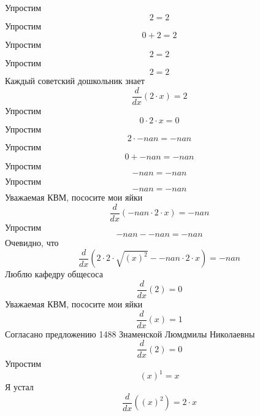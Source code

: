 \documentclass[12pt, a4paper]{article}
\begin{document}
Упростим
\begin{equation}
2 = 2
\end{equation}
Упростим
\begin{equation}
0+2 = 2
\end{equation}
Упростим
\begin{equation}
2 = 2
\end{equation}
Упростим
\begin{equation}
2 = 2
\end{equation}
Каждый советский дошкольник знает
\begin{equation}
\frac{d}{dx}(2 \cdot x) = 2
\end{equation}
Упростим
\begin{equation}
0 \cdot 2 \cdot x = 0
\end{equation}
Упростим
\begin{equation}
2 \cdot -nan = -nan
\end{equation}
Упростим
\begin{equation}
0+-nan = -nan
\end{equation}
Упростим
\begin{equation}
-nan = -nan
\end{equation}
Упростим
\begin{equation}
-nan = -nan
\end{equation}
Уважаемая КВМ, пососите мои яйки
\begin{equation}
\frac{d}{dx}(-nan \cdot 2 \cdot x) = -nan
\end{equation}
Упростим
\begin{equation}
-nan--nan = -nan
\end{equation}
Очевидно, что
\begin{equation}
\frac{d}{dx}(2 \cdot 2 \cdot \sqrt{{(x)}^{2}}--nan \cdot 2 \cdot x) = -nan
\end{equation}
Люблю кафедру общесоса
\begin{equation}
\frac{d}{dx}(2) = 0
\end{equation}
Уважаемая КВМ, пососите мои яйки
\begin{equation}
\frac{d}{dx}(x) = 1
\end{equation}
Согласано предложению 1488 Знаменской Люмдмилы Николаевны
\begin{equation}
\frac{d}{dx}(2) = 0
\end{equation}
Упростим
\begin{equation}
{(x)}^{1} = x
\end{equation}
Я устал
\begin{equation}
\frac{d}{dx}({(x)}^{2}) = 2 \cdot x
\end{equation}
\end{document}
